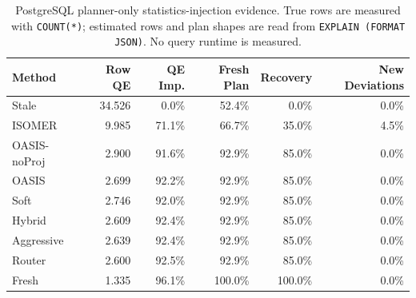 \begin{table}[t]
  \centering
  \small
  \caption{PostgreSQL planner-only statistics-injection evidence. True rows are measured with \texttt{COUNT(*)}; estimated rows and plan shapes are read from \texttt{EXPLAIN (FORMAT JSON)}. No query runtime is measured.}
  \label{tab:postgres_planner_stats_injection}
  \setlength{\tabcolsep}{4pt}
  \begin{tabular}{lrrrrr}
    \toprule
    Method & Row QE & QE Imp. & Fresh Plan & Recovery & New Deviations \\
    \midrule
    Stale & 34.526 & 0.0\% & 52.4\% & 0.0\% & 0.0\% \\
    ISOMER & 9.985 & 71.1\% & 66.7\% & 35.0\% & 4.5\% \\
    OASIS-noProj & 2.900 & 91.6\% & 92.9\% & 85.0\% & 0.0\% \\
    OASIS & 2.699 & 92.2\% & 92.9\% & 85.0\% & 0.0\% \\
    Soft & 2.746 & 92.0\% & 92.9\% & 85.0\% & 0.0\% \\
    Hybrid & 2.609 & 92.4\% & 92.9\% & 85.0\% & 0.0\% \\
    Aggressive & 2.639 & 92.4\% & 92.9\% & 85.0\% & 0.0\% \\
    Router & 2.600 & 92.5\% & 92.9\% & 85.0\% & 0.0\% \\
    Fresh & 1.335 & 96.1\% & 100.0\% & 100.0\% & 0.0\% \\
    \bottomrule
  \end{tabular}
\end{table}
